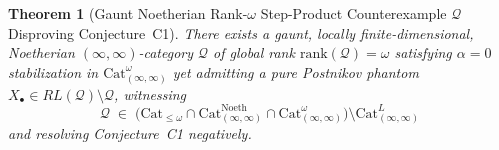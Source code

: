 \documentclass[10pt,twoside,openright]{book}
\theoremstyle{crmplain}
\newtheorem{theorem}{Theorem}[section]
\theoremstyle{crmdef}
\theoremstyle{crmremark}
\newcommand{\lean}[1]{\ignorespaces}
\newcommand{\leanwitness}{\ignorespaces}
\begin{document}
\begin{theorem}[Gaunt Noetherian Rank-$\omega$ Step-Product Counterexample $\mathcal{Q}$ Disproving Conjecture~C1]\label{thm:step-product-counterexample}%
\lean{HomotopyCRM.isHereditarilyGaunt_monoid, HomotopyCRM.absorbingMonoid_collapse_le, HomotopyCRM.stepProductQ_omega_completeness, HomotopyCRM.isHereditarilyGaunt_qFull, HomotopyCRM.homQ_card_eq, HomotopyCRM.qFull_not_nTruncated, HomotopyCRM.theorem12D_stepProductQ_phantom_not_realized, HomotopyCRM.conjecture_c1_disproof_summary}%
\leanwitness%
%
There exists a gaunt, locally finite-dimensional, Noetherian $(\infty, \infty)$-category $\mathcal{Q}$ of global rank $\mathrm{rank}(\mathcal{Q}) = \omega$ satisfying $\alpha = 0$ stabilization in $\mathrm{Cat}^\omega_{(\infty, \infty)}$ yet admitting a pure Postnikov phantom $X_\bullet \in RL(\mathcal{Q}) \setminus \mathcal{Q}$, witnessing
\[
  \mathcal{Q} \;\in\; \bigl(\mathrm{Cat}_{\le \omega} \cap \mathrm{Cat}^{\mathrm{Noeth}}_{(\infty, \infty)} \cap \mathrm{Cat}^\omega_{(\infty, \infty)}\bigr) \setminus \mathrm{Cat}^L_{(\infty, \infty)}
\]
and resolving Conjecture~C1 negatively.
\end{theorem}
\end{document}
